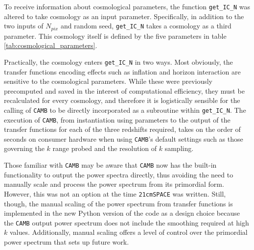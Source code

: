 \documentclass[floats,floatfix,showpacs,amssymb,prd,superscriptaddress,nofootinbib]{revtex4-2} %
\newcommand{\code}{\texttt}
\newcommand{\red}{\textcolor{red}}
\begin{document}

To receive information about cosmological parameters, the function \code{get\_IC\_N} was altered to take cosmology as an input parameter. Specifically, in addition to the two inputs of $N_{pix}$ and random seed, \code{get\_IC\_N} takes a cosmology as a third parameter. This cosmology itself is defined by the five parameters in table \ref{tab:cosmological_parameters}.

Practically, the cosmology enters \code{get\_IC\_N} in two ways. Most obviously, the transfer functions encoding effects such as inflation and horizon interaction are sensitive to the cosmological parameters. While these were previously precomputed and saved in the interest of computational efficiency, they must be recalculated for every cosmology, and therefore it is logistically sensible for the calling of \code{CAMB} to be directly incorporated as a subroutine within \code{get\_IC\_N}. The execution of \code{CAMB}, from instantiation using parameters to the output of the transfer functions for each of the three redshifts required, takes on the order of seconds on consumer hardware when using \code{CAMB}'s default settings such as those governing the $k$ range probed and the resolution of $k$ sampling. %

Those familiar with \code{CAMB} may be aware that \code{CAMB} now has the built-in functionality to output the power spectra directly, thus avoiding the need to manually scale and process the power spectrum from its primordial form. However, this was not an option at the time \code{21cmSPACE} was written. Still, though, the manual scaling of the power spectrum from transfer functions is implemented in the new Python version of the code as a design choice because the \code{CAMB} output power spectrum does not include the smoothing required at high $k$ values. Additionally, manual scaling offers a level of control over the primordial power spectrum that sets up future work.
\end{document}
